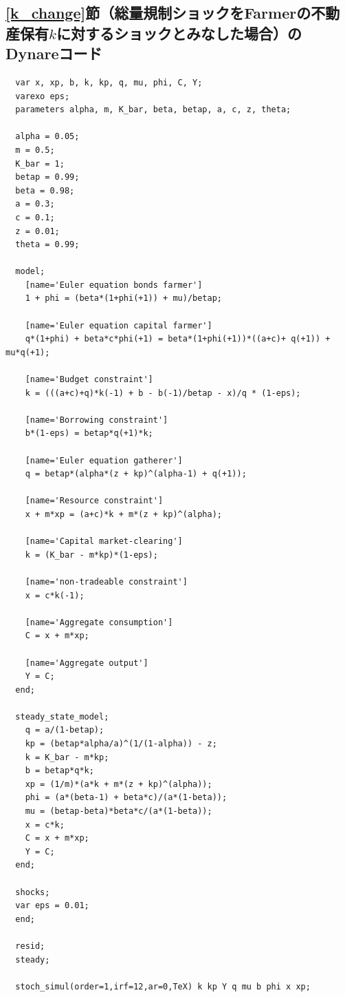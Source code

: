 \documentclass[dvipdfmx]{jlreq}
\begin{document}
\subsection*{\ref{k_change}節（総量規制ショックをFarmerの不動産保有$k$に対するショックとみなした場合）のDynareコード}
\begin{lstlisting}
  var x, xp, b, k, kp, q, mu, phi, C, Y;
  varexo eps;
  parameters alpha, m, K_bar, beta, betap, a, c, z, theta;
  
  alpha = 0.05;
  m = 0.5;
  K_bar = 1;
  betap = 0.99;
  beta = 0.98;
  a = 0.3;  
  c = 0.1;
  z = 0.01;
  theta = 0.99;
  
  model;
    [name='Euler equation bonds farmer']
    1 + phi = (beta*(1+phi(+1)) + mu)/betap;
    
    [name='Euler equation capital farmer']
    q*(1+phi) + beta*c*phi(+1) = beta*(1+phi(+1))*((a+c)+ q(+1)) + mu*q(+1);
    
    [name='Budget constraint']
    k = (((a+c)+q)*k(-1) + b - b(-1)/betap - x)/q * (1-eps);
    
    [name='Borrowing constraint']
    b*(1-eps) = betap*q(+1)*k;
    
    [name='Euler equation gatherer']
    q = betap*(alpha*(z + kp)^(alpha-1) + q(+1));
    
    [name='Resource constraint']
    x + m*xp = (a+c)*k + m*(z + kp)^(alpha);
    
    [name='Capital market-clearing']
    k = (K_bar - m*kp)*(1-eps);
    
    [name='non-tradeable constraint']
    x = c*k(-1);
    
    [name='Aggregate consumption']
    C = x + m*xp;
    
    [name='Aggregate output']
    Y = C;
  end;
  
  steady_state_model;
    q = a/(1-betap);
    kp = (betap*alpha/a)^(1/(1-alpha)) - z;
    k = K_bar - m*kp;
    b = betap*q*k;
    xp = (1/m)*(a*k + m*(z + kp)^(alpha));
    phi = (a*(beta-1) + beta*c)/(a*(1-beta));
    mu = (betap-beta)*beta*c/(a*(1-beta));
    x = c*k;
    C = x + m*xp;
    Y = C;
  end;
  
  shocks;
  var eps = 0.01;
  end;
  
  resid;
  steady;
  
  stoch_simul(order=1,irf=12,ar=0,TeX) k kp Y q mu b phi x xp;
\end{lstlisting}
\end{document}
